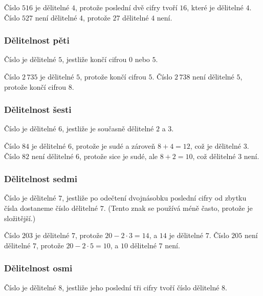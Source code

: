 \documentclass[12pt,a4paper]{article}
\begin{document}
\begin{examplebox}
Číslo $516$ je dělitelné $4$, protože poslední dvě cifry tvoří $16$, které je dělitelné $4$.  
Číslo $527$ není dělitelné $4$, protože $27$ dělitelné $4$ není.
\end{examplebox}

\subsubsection*{Dělitelnost pěti}
Číslo je dělitelné $5$, jestliže končí cifrou $0$ nebo $5$.  

\begin{examplebox}
Číslo $2\,735$ je dělitelné $5$, protože končí cifrou $5$.  
Číslo $2\,738$ není dělitelné $5$, protože končí cifrou $8$.
\end{examplebox}

\subsubsection*{Dělitelnost šesti}
Číslo je dělitelné $6$, jestliže je současně dělitelné $2$ a $3$.  

\begin{examplebox}
Číslo $84$ je dělitelné $6$, protože je sudé a zároveň $8+4=12$, což je dělitelné $3$.  
Číslo $82$ není dělitelné $6$, protože sice je sudé, ale $8+2=10$, což dělitelné $3$ není.
\end{examplebox}


\subsubsection*{Dělitelnost sedmi}
Číslo je dělitelné $7$, jestliže po odečtení dvojnásobku poslední cifry od zbytku čísla dostaneme číslo dělitelné $7$.  
(Tento znak se používá méně často, protože je složitější.)  

\begin{examplebox}
Číslo $203$ je dělitelné $7$, protože $20 - 2 \cdot 3 = 14$, a $14$ je dělitelné $7$.  
Číslo $205$ není dělitelné $7$, protože $20 - 2 \cdot 5 = 10$, a $10$ dělitelné $7$ není.
\end{examplebox}

\subsubsection*{Dělitelnost osmi}
Číslo je dělitelné $8$, jestliže jeho poslední tři cifry tvoří číslo dělitelné $8$.  
\end{document}
